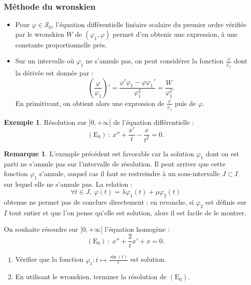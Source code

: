 \documentclass[french]{article}
\theoremstyle{plain}
\theoremstyle{definition}
\newtheorem*{ex}{Exemple}
\newtheorem*{rmq}{Remarque}
\theoremstyle{remark}
\begin{document}
\subsubsection*{Méthode du wronskien}

\begin{itemize}
	\item Pour $\varphi\in\mathcal{S}_0$, l'équation différentielle linéaire scalaire du premier ordre vérifiée par le wronskien $W$ de $(\varphi_1,\varphi)$ permet d'en obtenir une expression, à une constante proportionnelle près.
	\item Sur un intervalle où $\varphi_1$ ne s'annule pas, on peut considérer la fonction $\displaystyle\frac{\varphi}{\varphi_1}$ dont la dérivée est donnée par :
	$$\left(\frac{\varphi}{\varphi_1}\right)'=\frac{\varphi'\varphi_1-\varphi\varphi_1'}{\varphi_1^2}=\frac{W}{\varphi_1^2}.$$
	En primitivant, on obtient alors une expression de $\displaystyle\frac{\varphi}{\varphi_1}$ puis de $\varphi$.
\end{itemize}

\begin{ex}
	Résolution sur $]0,+\infty[$ de l'équation différentielle :
	$$(\text{E}_0)\ :\ x''+\frac{x'}{t}-\frac{x}{t^2}=0.$$
\end{ex}

\begin{rmq}
	L'exemple précédent est favorable car la solution $\varphi_1$ dont on est parti ne s'annule pas sur l'intervalle de résolution. Il peut arriver que cette fonction $\varphi_1$ s'annule, auquel cas il faut se restreindre à un sous-intervalle $J\subset I$ sur lequel elle ne s'annule pas. La relation :
	$$\forall t\in J,\ \varphi(t)=\lambda\varphi_1(t)+\mu\varphi_2(t)$$
	obtenue ne permet pas de conclure directement : en revanche, si $\varphi_2$ est définie sur $I$ tout entier et que l'on pense qu'elle est solution, alors il est facile de le montrer.
\end{rmq}

\begin{exo}
	On souhaite résoudre sur $]0,+\infty[$ l'équation homogène :
	$$(\text{E}_0)\ :\ x''+\frac{2}{t}x'+x=0.$$
	\begin{enumerate}
		\item Vérifier que la fonction $\varphi_1:t\mapsto\displaystyle\frac{\sin(t)}{t}$ est solution. %
		\item En utilisant le wronskien, terminer la résolution de $(\text{E}_0)$.
	\end{enumerate}	
\end{exo}
\end{document}
